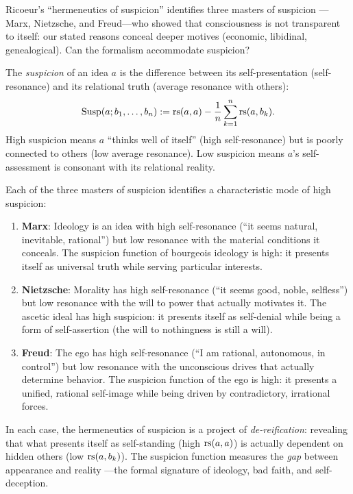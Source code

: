 Ricoeur's ``hermeneutics of suspicion'' identifies three masters of suspicion
---Marx, Nietzsche, and Freud---who showed that consciousness is not
transparent to itself: our stated reasons conceal deeper motives (economic,
libidinal, genealogical). Can the formalism accommodate suspicion?

\begin{definition}
\label{def:suspicion}
The \emph{suspicion} of an idea $a$ is the difference between its
self-presentation (self-resonance) and its relational truth (average
resonance with others):
\[
\mathrm{Susp}(a; b_1, \ldots, b_n) := \mathrm{rs}(a, a) -
\frac{1}{n}\sum_{k=1}^{n} \mathrm{rs}(a, b_k).
\]
High suspicion means $a$ ``thinks well of itself'' (high self-resonance) but
is poorly connected to others (low average resonance). Low suspicion means
$a$'s self-assessment is consonant with its relational reality.
\end{definition}

\begin{interpretation}
Each of the three masters of suspicion identifies a characteristic mode of
high suspicion:

\begin{enumerate}
\item \textbf{Marx}: Ideology is an idea with high self-resonance
(``it seems natural, inevitable, rational'') but low resonance with
the material conditions it conceals. The suspicion function of bourgeois
ideology is high: it presents itself as universal truth while serving
particular interests.

\item \textbf{Nietzsche}: Morality has high self-resonance (``it seems
good, noble, selfless'') but low resonance with the will to power that
actually motivates it. The ascetic ideal has high suspicion: it presents
itself as self-denial while being a form of self-assertion (the will to
nothingness is still a will).

\item \textbf{Freud}: The ego has high self-resonance (``I am rational,
autonomous, in control'') but low resonance with the unconscious drives
that actually determine behavior. The suspicion function of the ego is
high: it presents a unified, rational self-image while being driven by
contradictory, irrational forces.
\end{enumerate}

In each case, the hermeneutics of suspicion is a project of
\emph{de-reification}: revealing that what presents itself as self-standing
(high $\mathrm{rs}(a,a)$) is actually dependent on hidden others (low $\mathrm{rs}(a, b_k)$).
The suspicion function measures the \emph{gap} between appearance and reality
---the formal signature of ideology, bad faith, and self-deception.
\end{interpretation}

